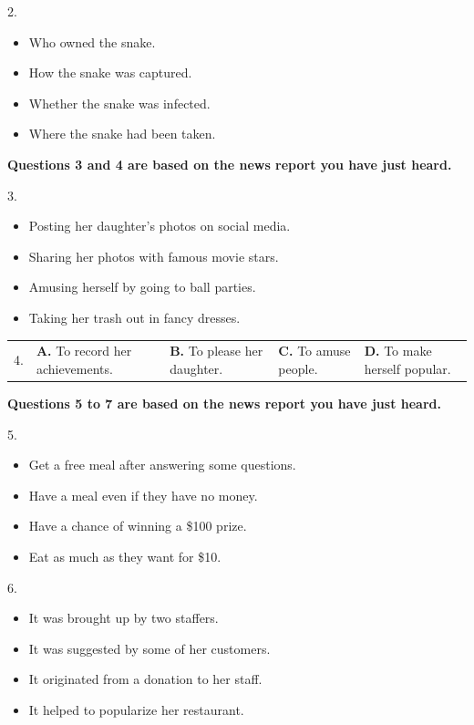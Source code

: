 \documentclass[UTF8,11pt]{ctexart}
\begin{document}
2.


\begin{itemize}[leftmargin=2em,itemsep=.2em,topsep=.4em]\item[A.] Who owned the snake.
\item[B.] How the snake was captured.
\item[C.] Whether the snake was infected.
\item[D.] Where the snake had been taken.
\end{itemize}

\textbf{Questions 3 and 4 are based on the news report you have just heard.}


3.


\begin{itemize}[leftmargin=2em,itemsep=.2em,topsep=.4em]\item[A.] Posting her daughter’s photos on social media.
\item[B.] Sharing her photos with famous movie stars.
\item[C.] Amusing herself by going to ball parties.
\item[D.] Taking her trash out in fancy dresses.
\end{itemize}

\noindent\begin{tabularx}{\linewidth}{@{}lXXXX@{}}4. & \textbf{A.} To record her achievements. & \textbf{B.} To please her daughter. & \textbf{C.} To amuse people. & \textbf{D.} To make herself popular.\\\end{tabularx}\par

\textbf{Questions 5 to 7 are based on the news report you have just heard.}


5.


\begin{itemize}[leftmargin=2em,itemsep=.2em,topsep=.4em]\item[A.] Get a free meal after answering some questions.
\item[B.] Have a meal even if they have no money.
\item[C.] Have a chance of winning a \$100 prize.
\item[D.] Eat as much as they want for \$10.
\end{itemize}

6.


\begin{itemize}[leftmargin=2em,itemsep=.2em,topsep=.4em]\item[A.] It was brought up by two staffers.
\item[B.] It was suggested by some of her customers.
\item[C.] It originated from a donation to her staff.
\item[D.] It helped to popularize her restaurant.
\end{itemize}
\end{document}
